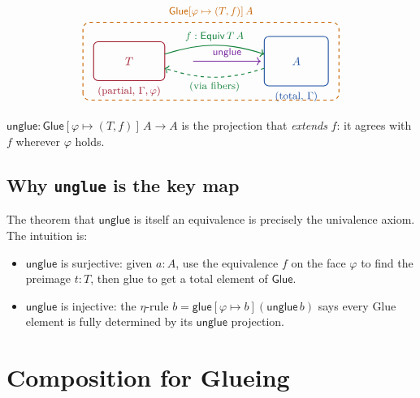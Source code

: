 \documentclass[11pt, a4paper]{article}
\newcommand{\pt}[1]{\mathsf{#1}}
\newcommand{\GlueT}{\pt{Glue}}
\newcommand{\glueT}{\pt{glue}}
\newcommand{\unglueT}{\pt{unglue}}
\newcommand{\EquivT}{\pt{Equiv}}
\newcommand{\sys}[2]{[#1 \mapsto #2]}
\begin{document}
\[
\begin{tikzpicture}[baseline={(0,0)}, scale=1.1]
  \draw[thick, deepblue, rounded corners=4pt] (1.6,-0.7) rectangle (3.4,0.7);
  \node[deepblue] at (2.5, 0) {$A$};
  \node[deepblue, font=\small] at (2.5,-1.0) {(total, $\Gamma$)};

  \draw[thick, deepred, rounded corners=4pt] (-3.2,-0.55) rectangle (-1.2,0.55);
  \node[deepred] at (-2.2,0) {$T$};
  \node[deepred, font=\small] at (-2.2,-0.85) {(partial, $\Gamma,\varphi$)};

  \draw[->, thick, deepgreen] (-1.2, 0.2) to[bend left=18]
    node[above, font=\small]{$f : \EquivT\,T\,A$} (1.6, 0.2);
  \draw[->, thick, deepgreen, dashed] (1.6,-0.2) to[bend left=18]
    node[below, font=\small]{(via fibers)} (-1.2,-0.2);

  \draw[thick, deeporange, rounded corners=6pt, dashed]
    (-3.5,-1.1) rectangle (3.7, 1.1);
  \node[deeporange, font=\small\bfseries] at (0.1, 1.4)
    {$\GlueT\sys{\varphi}{(T,f)}\,A$};

  \draw[->, thick, deeppurple]
    (-0.4, 0) -- (1.5, 0) node[midway, above, font=\small]{$\unglueT$};
\end{tikzpicture}
\]

$\unglueT : \GlueT\sys{\varphi}{(T,f)}\,A \to A$ is the projection that
\emph{extends} $f$: it agrees with $f$ wherever $\varphi$ holds.

\subsection{Why \texttt{unglue} is the key map}

The theorem that $\unglueT$ is itself an equivalence is precisely the
univalence axiom. The intuition is:
\begin{itemize}
  \item $\unglueT$ is surjective: given $a : A$, use the equivalence $f$ on
        the face $\varphi$ to find the preimage $t : T$, then glue to get a
        total element of $\GlueT$.
  \item $\unglueT$ is injective: the $\eta$-rule $b = \glueT\sys{\varphi}{b}
        (\unglueT\,b)$ says every Glue element is fully determined by its
        $\unglueT$ projection.
\end{itemize}

\section{Composition for Glueing}
\end{document}
